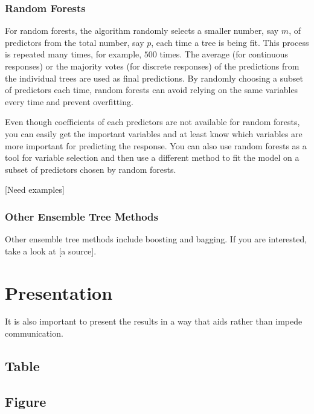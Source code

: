 \documentclass[
]{book}
\begin{document}
\hypertarget{random-forests}{%
\subsection{Random Forests}\label{random-forests}}

For random forests, the algorithm randomly selects a smaller number, say \(m\), of predictors from the total number, say \(p\), each time a tree is being fit. This process is repeated many times, for example, \(500\) times. The average (for continuous responses) or the majority votes (for discrete responses) of the predictions from the individual trees are used as final predictions. By randomly choosing a subset of predictors each time, random forests can avoid relying on the same variables every time and prevent overfitting.

Even though coefficients of each predictors are not available for random forests, you can easily get the important variables and at least know which variables are more important for predicting the response. You can also use random forests as a tool for variable selection and then use a different method to fit the model on a subset of predictors chosen by random forests.

{[}Need examples{]}

\hypertarget{other-ensemble-tree-methods}{%
\subsection{Other Ensemble Tree Methods}\label{other-ensemble-tree-methods}}

Other ensemble tree methods include boosting and bagging. If you are interested, take a look at {[}a source{]}.

\hypertarget{presentation}{%
\chapter{Presentation}\label{presentation}}

It is also important to present the results in a way that aids rather than impede communication.

\hypertarget{table}{%
\section{Table}\label{table}}

\hypertarget{figure}{%
\section{Figure}\label{figure}}
\end{document}
